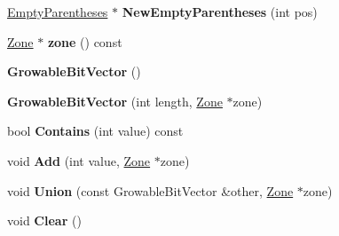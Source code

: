 \begin{DoxyCompactItemize}
\item 
\hyperlink{classv8_1_1internal_1_1_empty_parentheses}{Empty\+Parentheses} $\ast$ {\bfseries New\+Empty\+Parentheses} (int pos)\hypertarget{classv8_1_1internal_1_1_b_a_s_e___e_m_b_e_d_d_e_d_a36ec4a1e9de1f9ba9b811b004b6c7265}{}\label{classv8_1_1internal_1_1_b_a_s_e___e_m_b_e_d_d_e_d_a36ec4a1e9de1f9ba9b811b004b6c7265}

\item 
\hyperlink{classv8_1_1internal_1_1_zone}{Zone} $\ast$ {\bfseries zone} () const \hypertarget{classv8_1_1internal_1_1_b_a_s_e___e_m_b_e_d_d_e_d_a52fc0e306aa3628bf7e2d0c397a1f5c6}{}\label{classv8_1_1internal_1_1_b_a_s_e___e_m_b_e_d_d_e_d_a52fc0e306aa3628bf7e2d0c397a1f5c6}

\item 
{\bfseries Growable\+Bit\+Vector} ()\hypertarget{classv8_1_1internal_1_1_b_a_s_e___e_m_b_e_d_d_e_d_ae7533dfb8c0ac95e9533d9a162fcddae}{}\label{classv8_1_1internal_1_1_b_a_s_e___e_m_b_e_d_d_e_d_ae7533dfb8c0ac95e9533d9a162fcddae}

\item 
{\bfseries Growable\+Bit\+Vector} (int length, \hyperlink{classv8_1_1internal_1_1_zone}{Zone} $\ast$zone)\hypertarget{classv8_1_1internal_1_1_b_a_s_e___e_m_b_e_d_d_e_d_a72b76cc33a292519ad38e7fef5a51c33}{}\label{classv8_1_1internal_1_1_b_a_s_e___e_m_b_e_d_d_e_d_a72b76cc33a292519ad38e7fef5a51c33}

\item 
bool {\bfseries Contains} (int value) const \hypertarget{classv8_1_1internal_1_1_b_a_s_e___e_m_b_e_d_d_e_d_a793207c3d836f91946a00400581cb106}{}\label{classv8_1_1internal_1_1_b_a_s_e___e_m_b_e_d_d_e_d_a793207c3d836f91946a00400581cb106}

\item 
void {\bfseries Add} (int value, \hyperlink{classv8_1_1internal_1_1_zone}{Zone} $\ast$zone)\hypertarget{classv8_1_1internal_1_1_b_a_s_e___e_m_b_e_d_d_e_d_a8319fbbd54230cd7c54335aeee3d05c3}{}\label{classv8_1_1internal_1_1_b_a_s_e___e_m_b_e_d_d_e_d_a8319fbbd54230cd7c54335aeee3d05c3}

\item 
void {\bfseries Union} (const Growable\+Bit\+Vector \&other, \hyperlink{classv8_1_1internal_1_1_zone}{Zone} $\ast$zone)\hypertarget{classv8_1_1internal_1_1_b_a_s_e___e_m_b_e_d_d_e_d_a11cf75f181028349eb12917316e24843}{}\label{classv8_1_1internal_1_1_b_a_s_e___e_m_b_e_d_d_e_d_a11cf75f181028349eb12917316e24843}

\item 
void {\bfseries Clear} ()\hypertarget{classv8_1_1internal_1_1_b_a_s_e___e_m_b_e_d_d_e_d_ab116508b5f5cbaedc057424d77489933}{}\label{classv8_1_1internal_1_1_b_a_s_e___e_m_b_e_d_d_e_d_ab116508b5f5cbaedc057424d77489933}


\end{DoxyCompactItemize}
